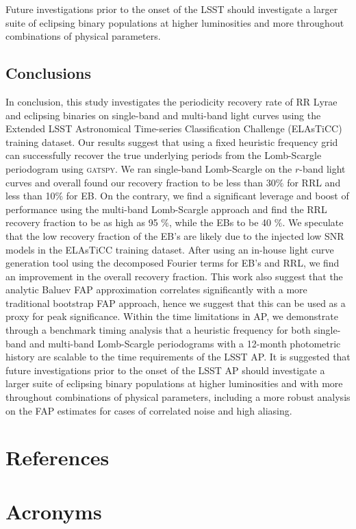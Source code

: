 \documentclass[DM,authoryear,toc]{lsstdoc}
\begin{document}
Future investigations prior to the onset of the LSST should investigate a larger suite of eclipsing binary populations at higher luminosities and more throughout  combinations of physical parameters.

\subsection{Conclusions}
In conclusion, this study investigates the periodicity recovery rate of RR Lyrae and eclipsing binaries on single-band and multi-band light curves using the Extended LSST Astronomical Time-series Classification Challenge (ELAsTiCC) training dataset. Our results suggest that using a fixed heuristic frequency grid can successfully recover the true underlying periods from the Lomb-Scargle periodogram using \textsc{gatspy}. We ran single-band Lomb-Scargle on the $r$-band light curves and overall found our recovery fraction to be less than 30$\%$ for RRL and less than 10$\%$ for EB. On the contrary,  we find a significant leverage and boost of performance using the multi-band Lomb-Scargle approach and find the RRL recovery fraction to be as high as 95 $\%$, while the EBs to be 40 $\%$. We speculate that the low recovery fraction of the EB's are likely due to the injected low SNR models in the ELAsTiCC training dataset. After using an in-house light curve generation tool using the decomposed Fourier terms for EB's and RRL, we find an improvement in the overall recovery fraction. This work also suggest that the analytic Baluev FAP approximation correlates significantly with a more traditional bootstrap FAP approach, hence we suggest that this can be used as a proxy for peak significance. Within the time limitations in AP, we demonstrate through a benchmark timing analysis that a heuristic frequency for both single-band and multi-band Lomb-Scargle periodograms with a 12-month photometric history are scalable to the time requirements of the LSST AP. It is suggested that future investigations prior to the onset of the LSST AP should investigate a larger suite of eclipsing binary populations at higher luminosities and with more throughout combinations of physical parameters, including a more robust analysis on the FAP estimates for cases of correlated noise and high aliasing. 

\appendix
\section{References} \label{sec:bib}


\section{Acronyms} \label{sec:acronyms}

\end{document}

